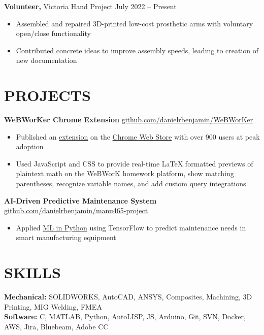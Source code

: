 \documentclass[11pt]{article}       %
\begin{document}
\vspace{3pt}

\textbf{Volunteer,} {Victoria Hand Project} \hfill July 2022 -- Present \\
\vspace{-8.5pt}
\begin{itemize}
  \item Assembled and repaired 3D-printed low-cost prosthetic arms with voluntary open/close functionality
  \item Contributed concrete ideas to improve assembly speeds, leading to creation of new documentation
\end{itemize}

\section*{PROJECTS}
\textbf{WeBWorKer Chrome Extension} \hfill \href{https://github.com/danielrbenjamin/WeBWorKer}{github.com/danielrbenjamin/WeBWorKer} \\
\vspace{-8.5pt}
\begin{itemize}
  \item Published an \href{https://www.danielrbenjamin.com/projects/webworker/}{extension} on the \href{https://chromewebstore.google.com/detail/webworker/cokogomdladilchdakkknehhnnoipbke}{Chrome Web Store} with over 900 users at peak adoption
  \item Used JavaScript and CSS to provide real-time LaTeX formatted previews of plaintext math on the WeBWorK homework platform, show matching parentheses, recognize variable names, and add custom query integrations
\end{itemize}

\vspace{3pt}

\textbf{AI-Driven Predictive Maintenance System} \hfill \href{https://github.com/danielrbenjamin/manu465-project}{github.com/danielrbenjamin/manu465-project} \\
\vspace{-8.5pt}
\begin{itemize}
  \item Applied \href{https://www.danielrbenjamin.com/projects/manu465-project/}{ML in Python} using TensorFlow to predict maintenance needs in smart manufacturing equipment
\end{itemize}

\section*{SKILLS}
\textbf{Mechanical:} SOLIDWORKS, AutoCAD, ANSYS, Composites, Machining, 3D Printing, MIG Welding, FMEA\\
\textbf{Software:} C, MATLAB, Python, AutoLISP, JS, Arduino, Git, SVN, Docker, AWS, Jira, Bluebeam, Adobe CC
\end{document}
